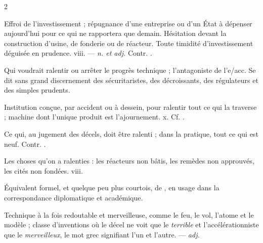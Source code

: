 \begin{multicols}{2}

 Effroi de l'investissement ; répugnance d'une entreprise ou d'un État à dépenser aujourd'hui pour ce qui ne rapportera que demain.   Hésitation devant la construction d'usine, de fonderie ou de réacteur.   Toute timidité d'investissement déguisée en prudence.   viii. —  \textit{n. et adj.} Contr. .

  Qui voudrait ralentir ou arrêter le progrès technique ; l'antagoniste de l'e/acc. Se dit sans grand discernement des sécuritaristes, des décroissants, des régulateurs et des simples prudents.

 Institution conçue, par accident ou à dessein, pour ralentir tout ce qui la traverse ; machine dont l'unique produit est l'ajournement.   x. Cf. .

 Ce qui, au jugement des décels, doit être ralenti ; dans la pratique, tout ce qui est neuf. Contr. .

  Les choses qu'on a ralenties : les réacteurs non bâtis, les remèdes non approuvés, les cités non fondées.   viii.

 Équivalent formel, et quelque peu plus courtois, de , en usage dans la correspondance diplomatique et académique.

 Technique à la fois redoutable et merveilleuse, comme le feu, le vol, l'atome et le modèle ; classe d'inventions où le décel ne voit que le \textit{terrible} et l'accélérationniste que le \textit{merveilleux}, le mot grec signifiant l'un et l'autre. —  \textit{adj.}


\end{multicols}
